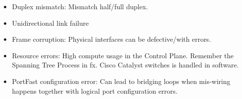 \begin{itemize}
    \item Duplex mismatch: Mismatch half/full duplex.
    \item Unidirectional link failure
    \item Frame corruption: Physical interfaces can be defective/with errors.
    \item Resource errors: High compute usage in the Control Plane. {\scriptsize Remember the Spanning Tree Process in fx. Cisco Catalyst switches is handled in software.}
    \item PortFast configuration error: Can lead to bridging loops when mis-wiring happens together with logical port configuration errors.
\end{itemize}

